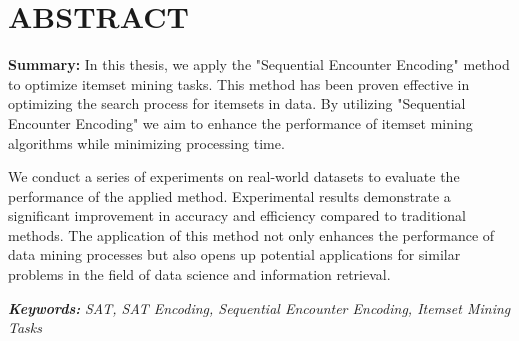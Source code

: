 \chapter*{ABSTRACT}
\fontsize{13}{15}\selectfont

\textbf{Summary:} In this thesis, we apply the "Sequential Encounter Encoding" method to optimize itemset mining tasks. This method has been proven effective in optimizing the search process for itemsets in data. By utilizing "Sequential Encounter Encoding" we aim to enhance the performance of itemset mining algorithms while minimizing processing time.

We conduct a series of experiments on real-world datasets to evaluate the performance of the applied method. Experimental results demonstrate a significant improvement in accuracy and efficiency compared to traditional methods. The application of this method not only enhances the performance of data mining processes but also opens up potential applications for similar problems in the field of data science and information retrieval.

\textbf{\textit{Keywords: }} \textit{SAT, SAT Encoding, Sequential Encounter Encoding, Itemset Mining Tasks}